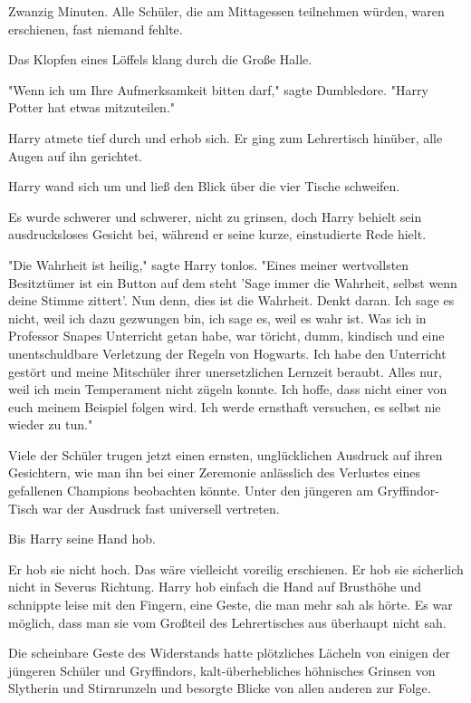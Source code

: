 {Zwanzig Minuten. Alle Schüler, die am Mittagessen teilnehmen würden, waren erschienen, fast niemand fehlte.

Das Klopfen eines Löffels klang durch die Große Halle.

"Wenn ich um Ihre Aufmerksamkeit bitten darf," sagte Dumbledore. "Harry Potter hat etwas mitzuteilen."

Harry atmete tief durch und erhob sich. Er ging zum Lehrertisch hinüber, alle Augen auf ihn gerichtet.

Harry wand sich um und ließ den Blick über die vier Tische schweifen.

Es wurde schwerer und schwerer, nicht zu grinsen, doch Harry behielt sein ausdrucksloses Gesicht bei, während er seine kurze, einstudierte Rede hielt.

"Die Wahrheit ist heilig," sagte Harry tonlos. "Eines meiner wertvollsten Besitztümer ist ein Button auf dem steht 'Sage immer die Wahrheit, selbst wenn deine Stimme zittert'. Nun denn, dies ist die Wahrheit. Denkt daran. Ich sage es nicht, weil ich dazu gezwungen bin, ich sage es, weil es wahr ist. Was ich in Professor Snapes Unterricht getan habe, war töricht, dumm, kindisch und eine unentschuldbare Verletzung der Regeln von Hogwarts. Ich habe den Unterricht gestört und meine Mitschüler ihrer unersetzlichen Lernzeit beraubt. Alles nur, weil ich mein Temperament nicht zügeln konnte. Ich hoffe, dass nicht einer von euch meinem Beispiel folgen wird. Ich werde ernsthaft versuchen, es selbst nie wieder zu tun."

Viele der Schüler trugen jetzt einen ernsten, unglücklichen Ausdruck auf ihren Gesichtern, wie man ihn bei einer Zeremonie anlässlich des Verlustes eines gefallenen Champions beobachten könnte. Unter den jüngeren am Gryffindor-Tisch war der Ausdruck fast universell vertreten.

Bis Harry seine Hand hob.

Er hob sie nicht hoch. Das wäre vielleicht voreilig erschienen. Er hob sie sicherlich nicht in Severus Richtung. Harry hob einfach die Hand auf Brusthöhe und schnippte leise mit den Fingern, eine Geste, die man mehr sah als hörte. Es war möglich, dass man sie vom Großteil des Lehrertisches aus überhaupt nicht sah.

Die scheinbare Geste des Widerstands hatte plötzliches Lächeln von einigen der jüngeren Schüler und Gryffindors, kalt-überhebliches höhnisches Grinsen von Slytherin und Stirnrunzeln und besorgte Blicke von allen anderen zur Folge.

}
